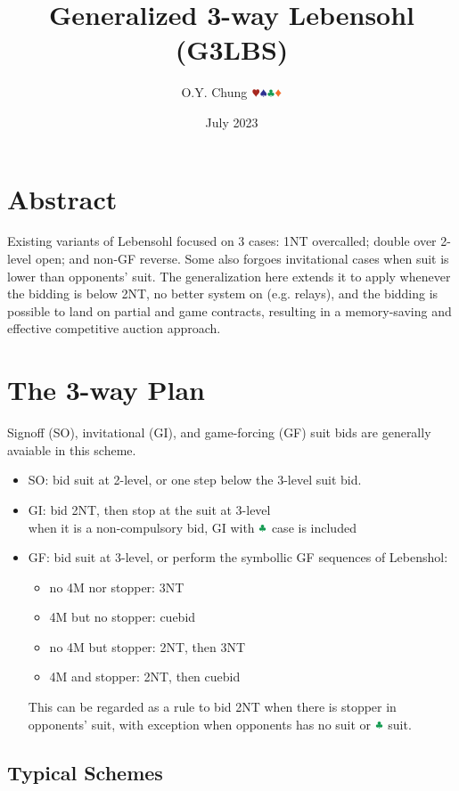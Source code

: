 \documentclass{article}
\title{Generalized 3-way Lebensohl (G3LBS)}
\author{O.Y. Chung $\hhh\sss\ccc\ddd$}
\date{July 2023}
\begin{document}
\maketitle
\begin{multicols}{2}
\begin{CJK*}{UTF8}{gt}

\section{Abstract}
Existing variants of Lebensohl focused on 3 cases: 1NT overcalled; double over 2-level open; and non-GF reverse. Some also forgoes invitational cases when suit is lower than opponents' suit. The generalization here extends it to apply whenever the bidding is below 2NT, no better system on (e.g. relays), and the bidding is possible to land on partial and game contracts, resulting in a memory-saving and effective competitive auction approach.

\section{The 3-way Plan}
Signoff (SO), invitational (GI), and game-forcing (GF) suit bids are generally avaiable in this scheme.

\begin{itemize}
    \item SO: bid suit at 2-level, or one step below the 3-level suit bid.
    \item GI: bid 2NT, then stop at the suit at 3-level \\
    when it is a non-compulsory bid, GI with $\ccc$ case is included
    \item GF: bid suit at 3-level, or perform the symbollic GF sequences of Lebenshol:
    \begin{itemize}
        \item no 4M nor stopper: 3NT
        \item 4M but no stopper: cuebid
        \item no 4M but stopper: 2NT, then 3NT
        \item 4M and stopper: 2NT, then cuebid
    \end{itemize}
    This can be regarded as a rule to bid 2NT when there is stopper in opponents' suit, with exception when opponents has no suit or $\ccc$ suit.
\end{itemize}

\subsection{Typical Schemes}

\end{CJK*}
\end{multicols}
\end{document}
